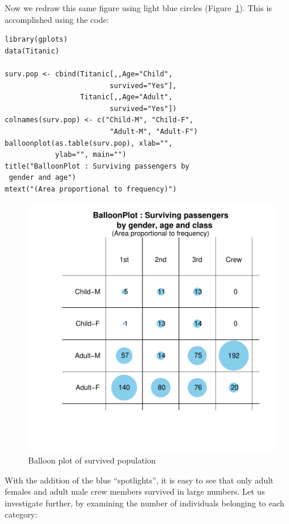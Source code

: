 \documentclass[a4paper]{report}
\begin{document}
\begin{article}
Now we redraw this same figure using light blue circles
(Figure~\ref{figure:Surv.Pop}).  This is accomplished using the code:

{\small
\begin{verbatim}
library(gplots)
data(Titanic)

surv.pop <- cbind(Titanic[,,Age="Child", 
                         survived="Yes"],
                  Titanic[,,Age="Adult", 
                         survived="Yes"])
colnames(surv.pop) <- c("Child-M", "Child-F",
                         "Adult-M", "Adult-F")
balloonplot(as.table(surv.pop), xlab="", 
            ylab="", main="")
title("BalloonPlot : Surviving passengers by
 gender and age")
mtext("(Area proportional to frequency)")
\end{verbatim}
 }

\begin{figure}[h]
\includegraphics[width=\textwidth]{SurvivedPop.pdf}
\vspace{-0.65in}
\caption{\label{figure:Surv.Pop}
Balloon plot of survived population}
\end{figure}

With the addition of the blue ``spotlights'', it is easy to see that
only adult females and adult male crew members survived in large
numbers. Let us investigate further, by examining the number
of individuals belonging to each category:


\end{article}
\end{document}
